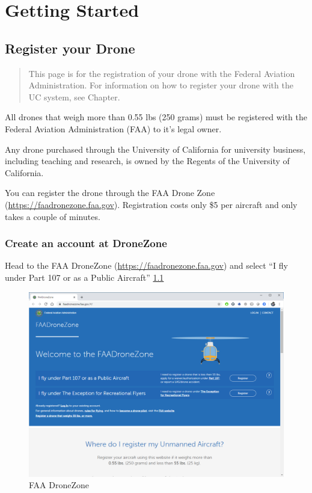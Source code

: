 \documentclass[
]{book}
\begin{document}
\hypertarget{part-getting-started}{%
\part{Getting Started}\label{part-getting-started}}

\hypertarget{ch-register}{%
\chapter{Register your Drone}\label{ch-register}}

\begin{quote}
This page is for the registration of your drone with the Federal Aviation Administration. For information on how to register your drone with the UC system, see Chapter.
\end{quote}

All drones that weigh more than 0.55 lbs (250 grams) must be registered with the Federal Aviation Administration (FAA) to it's legal owner.

Any drone purchased through the University of California for university business, including teaching and research, is owned by the Regents of the University of California.

You can register the drone through the FAA Drone Zone (\url{https://faadronezone.faa.gov}). Registration costs only \$5 per aircraft and only takes a couple of minutes.

\hypertarget{create-an-account-at-dronezone}{%
\section{Create an account at DroneZone}\label{create-an-account-at-dronezone}}

Head to the FAA DroneZone (\url{https://faadronezone.faa.gov}) and select ``I fly under Part 107 or as a Public Aircraft'' \ref{fig:reg-page}

\begin{figure}

{\centering \includegraphics[width=0.8\linewidth]{images/reg_site} 

}

\caption{FAA DroneZone}\label{fig:reg-page}
\end{figure}
\end{document}
